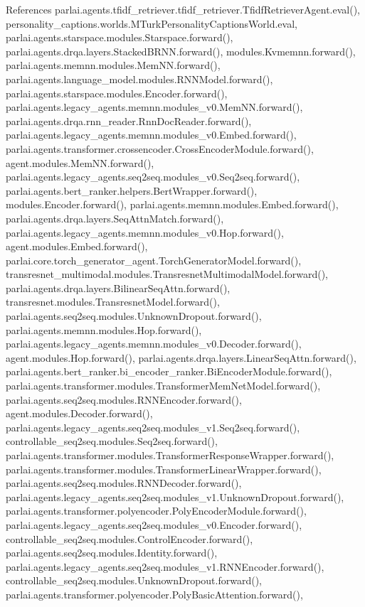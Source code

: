 References parlai.\+agents.\+tfidf\+\_\+retriever.\+tfidf\+\_\+retriever.\+Tfidf\+Retriever\+Agent.\+eval(), personality\+\_\+captions.\+worlds.\+M\+Turk\+Personality\+Captions\+World.\+eval, parlai.\+agents.\+starspace.\+modules.\+Starspace.\+forward(), parlai.\+agents.\+drqa.\+layers.\+Stacked\+B\+R\+N\+N.\+forward(), modules.\+Kvmemnn.\+forward(), parlai.\+agents.\+memnn.\+modules.\+Mem\+N\+N.\+forward(), parlai.\+agents.\+language\+\_\+model.\+modules.\+R\+N\+N\+Model.\+forward(), parlai.\+agents.\+starspace.\+modules.\+Encoder.\+forward(), parlai.\+agents.\+legacy\+\_\+agents.\+memnn.\+modules\+\_\+v0.\+Mem\+N\+N.\+forward(), parlai.\+agents.\+drqa.\+rnn\+\_\+reader.\+Rnn\+Doc\+Reader.\+forward(), parlai.\+agents.\+legacy\+\_\+agents.\+memnn.\+modules\+\_\+v0.\+Embed.\+forward(), parlai.\+agents.\+transformer.\+crossencoder.\+Cross\+Encoder\+Module.\+forward(), agent.\+modules.\+Mem\+N\+N.\+forward(), parlai.\+agents.\+legacy\+\_\+agents.\+seq2seq.\+modules\+\_\+v0.\+Seq2seq.\+forward(), parlai.\+agents.\+bert\+\_\+ranker.\+helpers.\+Bert\+Wrapper.\+forward(), modules.\+Encoder.\+forward(), parlai.\+agents.\+memnn.\+modules.\+Embed.\+forward(), parlai.\+agents.\+drqa.\+layers.\+Seq\+Attn\+Match.\+forward(), parlai.\+agents.\+legacy\+\_\+agents.\+memnn.\+modules\+\_\+v0.\+Hop.\+forward(), agent.\+modules.\+Embed.\+forward(), parlai.\+core.\+torch\+\_\+generator\+\_\+agent.\+Torch\+Generator\+Model.\+forward(), transresnet\+\_\+multimodal.\+modules.\+Transresnet\+Multimodal\+Model.\+forward(), parlai.\+agents.\+drqa.\+layers.\+Bilinear\+Seq\+Attn.\+forward(), transresnet.\+modules.\+Transresnet\+Model.\+forward(), parlai.\+agents.\+seq2seq.\+modules.\+Unknown\+Dropout.\+forward(), parlai.\+agents.\+memnn.\+modules.\+Hop.\+forward(), parlai.\+agents.\+legacy\+\_\+agents.\+memnn.\+modules\+\_\+v0.\+Decoder.\+forward(), agent.\+modules.\+Hop.\+forward(), parlai.\+agents.\+drqa.\+layers.\+Linear\+Seq\+Attn.\+forward(), parlai.\+agents.\+bert\+\_\+ranker.\+bi\+\_\+encoder\+\_\+ranker.\+Bi\+Encoder\+Module.\+forward(), parlai.\+agents.\+transformer.\+modules.\+Transformer\+Mem\+Net\+Model.\+forward(), parlai.\+agents.\+seq2seq.\+modules.\+R\+N\+N\+Encoder.\+forward(), agent.\+modules.\+Decoder.\+forward(), parlai.\+agents.\+legacy\+\_\+agents.\+seq2seq.\+modules\+\_\+v1.\+Seq2seq.\+forward(), controllable\+\_\+seq2seq.\+modules.\+Seq2seq.\+forward(), parlai.\+agents.\+transformer.\+modules.\+Transformer\+Response\+Wrapper.\+forward(), parlai.\+agents.\+transformer.\+modules.\+Transformer\+Linear\+Wrapper.\+forward(), parlai.\+agents.\+seq2seq.\+modules.\+R\+N\+N\+Decoder.\+forward(), parlai.\+agents.\+legacy\+\_\+agents.\+seq2seq.\+modules\+\_\+v1.\+Unknown\+Dropout.\+forward(), parlai.\+agents.\+transformer.\+polyencoder.\+Poly\+Encoder\+Module.\+forward(), parlai.\+agents.\+legacy\+\_\+agents.\+seq2seq.\+modules\+\_\+v0.\+Encoder.\+forward(), controllable\+\_\+seq2seq.\+modules.\+Control\+Encoder.\+forward(), parlai.\+agents.\+seq2seq.\+modules.\+Identity.\+forward(), parlai.\+agents.\+legacy\+\_\+agents.\+seq2seq.\+modules\+\_\+v1.\+R\+N\+N\+Encoder.\+forward(), controllable\+\_\+seq2seq.\+modules.\+Unknown\+Dropout.\+forward(), parlai.\+agents.\+transformer.\+polyencoder.\+Poly\+Basic\+Attention.\+forward(), 